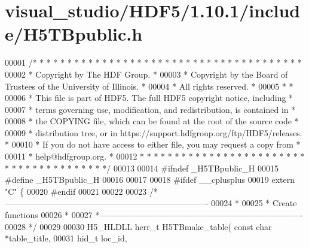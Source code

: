 \hypertarget{visual__studio_2_h_d_f5_21_810_81_2include_2_h5_t_bpublic_8h_source}{}\section{visual\+\_\+studio/\+H\+D\+F5/1.10.1/include/\+H5\+T\+Bpublic.h}
\label{visual__studio_2_h_d_f5_21_810_81_2include_2_h5_t_bpublic_8h_source}

\begin{DoxyCode}
00001 \textcolor{comment}{/* * * * * * * * * * * * * * * * * * * * * * * * * * * * * * * * * * * * * * *}
00002 \textcolor{comment}{ * Copyright by The HDF Group.                                               *}
00003 \textcolor{comment}{ * Copyright by the Board of Trustees of the University of Illinois.         *}
00004 \textcolor{comment}{ * All rights reserved.                                                      *}
00005 \textcolor{comment}{ *                                                                           *}
00006 \textcolor{comment}{ * This file is part of HDF5.  The full HDF5 copyright notice, including     *}
00007 \textcolor{comment}{ * terms governing use, modification, and redistribution, is contained in    *}
00008 \textcolor{comment}{ * the COPYING file, which can be found at the root of the source code       *}
00009 \textcolor{comment}{ * distribution tree, or in https://support.hdfgroup.org/ftp/HDF5/releases.  *}
00010 \textcolor{comment}{ * If you do not have access to either file, you may request a copy from     *}
00011 \textcolor{comment}{ * help@hdfgroup.org.                                                        *}
00012 \textcolor{comment}{ * * * * * * * * * * * * * * * * * * * * * * * * * * * * * * * * * * * * * * */}
00013 
00014 \textcolor{preprocessor}{#ifndef \_H5TBpublic\_H}
00015 \textcolor{preprocessor}{#define \_H5TBpublic\_H}
00016 
00017 
00018 \textcolor{preprocessor}{#ifdef \_\_cplusplus}
00019 \textcolor{keyword}{extern} \textcolor{stringliteral}{"C"} \{
00020 \textcolor{preprocessor}{#endif}
00021 
00022 
00023 \textcolor{comment}{/*-------------------------------------------------------------------------}
00024 \textcolor{comment}{ *}
00025 \textcolor{comment}{ * Create functions}
00026 \textcolor{comment}{ *}
00027 \textcolor{comment}{ *-------------------------------------------------------------------------}
00028 \textcolor{comment}{ */}
00029 
00030 H5\_HLDLL herr\_t  H5TBmake\_table( \textcolor{keyword}{const} \textcolor{keywordtype}{char} *table\_title,
00031                        hid\_t loc\_id,

\end{DoxyCode}
